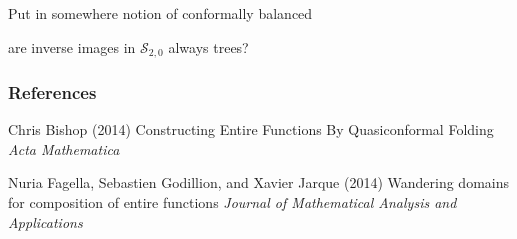 \documentclass{beamer}
\begin{document}
\begin{frame}

\end{frame}











\begin{frame}

Put in somewhere notion of {\color{red} conformally balanced}

are inverse images in $\mathcal{S}_{2,0}$ always trees?

\end{frame}








\begin{frame}
\frametitle{References}
\footnotesize{
\begin{thebibliography}{99} %
  Chris Bishop (2014)
\newblock Constructing Entire Functions By Quasiconformal Folding
\newblock \emph{Acta Mathematica}

 Nuria Fagella, Sebastien Godillion, and Xavier Jarque (2014)
\newblock Wandering domains for composition of entire functions
\newblock \emph{Journal of Mathematical Analysis and Applications} 


\end{thebibliography}
}
\end{frame}


\end{document}
